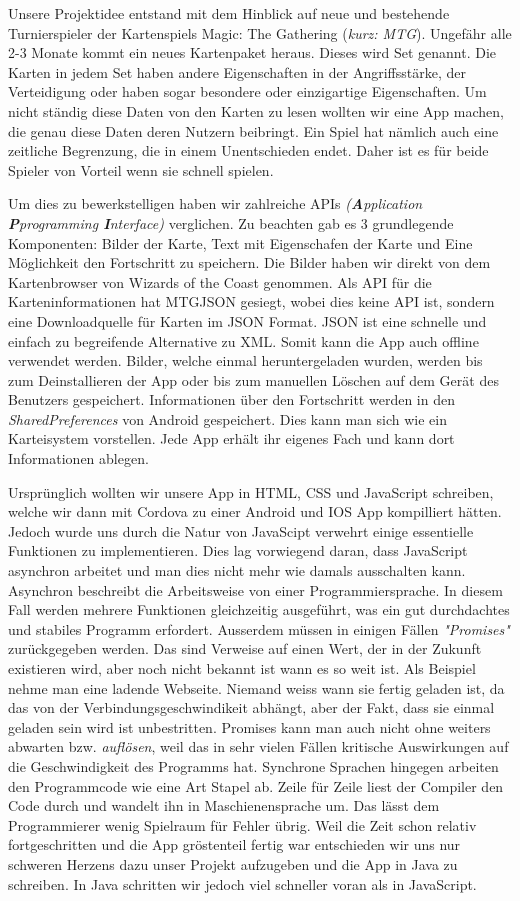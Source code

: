 Unsere Projektidee entstand mit dem Hinblick auf neue und bestehende Turnierspieler der Kartenspiels Magic: The Gathering (\textit{kurz: MTG}).
Ungefähr alle 2-3 Monate kommt ein neues Kartenpaket heraus. Dieses wird Set genannt. Die Karten in jedem Set haben andere Eigenschaften in der Angriffsstärke, der Verteidigung oder haben sogar besondere oder einzigartige Eigenschaften. Um nicht ständig diese Daten von den Karten zu lesen wollten wir eine App machen, die genau diese Daten deren Nutzern beibringt.
Ein Spiel hat nämlich auch eine zeitliche Begrenzung, die in einem Unentschieden endet. Daher ist es für beide Spieler von Vorteil wenn sie schnell spielen.

Um dies zu bewerkstelligen haben wir zahlreiche APIs \textit{(\textbf{A}pplication \textbf{P}programming \textbf{I}nterface)} verglichen. Zu beachten gab es 3 grundlegende Komponenten: Bilder der Karte, Text mit Eigenschafen der Karte und Eine Möglichkeit den Fortschritt zu speichern. Die Bilder haben wir direkt von dem Kartenbrowser von Wizards of the Coast genommen. Als API für die Karteninformationen hat MTGJSON gesiegt, wobei dies keine API ist, sondern eine Downloadquelle für Karten im JSON Format. JSON ist eine schnelle und einfach zu begreifende Alternative zu XML. Somit kann die App auch offline verwendet werden. Bilder, welche einmal heruntergeladen wurden, werden bis zum Deinstallieren der App oder bis zum manuellen Löschen auf dem Gerät des Benutzers gespeichert. Informationen über den Fortschritt werden in den \textit{SharedPreferences} von Android gespeichert. Dies kann man sich wie ein Karteisystem vorstellen. Jede App erhält ihr eigenes Fach und kann dort Informationen ablegen.

Ursprünglich wollten wir unsere App in HTML, CSS und JavaScript schreiben, welche wir dann mit Cordova zu einer Android und IOS App kompilliert hätten.
Jedoch wurde uns durch die Natur von JavaScipt verwehrt einige essentielle Funktionen zu implementieren. Dies lag vorwiegend daran, dass JavaScript asynchron arbeitet und man dies nicht mehr wie damals ausschalten kann. Asynchron beschreibt die Arbeitsweise von einer Programmiersprache. In diesem Fall werden mehrere Funktionen gleichzeitig ausgeführt, was ein gut durchdachtes und stabiles Programm erfordert. Ausserdem müssen in einigen Fällen \textit{"Promises"} zurückgegeben werden. Das sind Verweise auf einen Wert, der in der Zukunft existieren wird, aber noch nicht bekannt ist wann es so weit ist. Als Beispiel nehme man eine ladende Webseite. Niemand weiss wann sie fertig geladen ist, da das von der Verbindungsgeschwindikeit abhängt, aber der Fakt, dass sie einmal geladen sein wird ist unbestritten. Promises kann man auch nicht ohne weiters abwarten bzw. \textit{auflösen}, weil das in sehr vielen Fällen kritische Auswirkungen auf die Geschwindigkeit des Programms hat. Synchrone Sprachen hingegen arbeiten den Programmcode wie eine Art Stapel ab. Zeile für Zeile liest der Compiler den Code durch und wandelt ihn in Maschienensprache um. Das lässt dem Programmierer wenig Spielraum für Fehler übrig. Weil die Zeit schon relativ fortgeschritten und die App gröstenteil fertig war entschieden wir uns nur schweren Herzens dazu unser Projekt aufzugeben und die App in Java zu schreiben. In Java schritten wir jedoch viel schneller voran als in JavaScript.